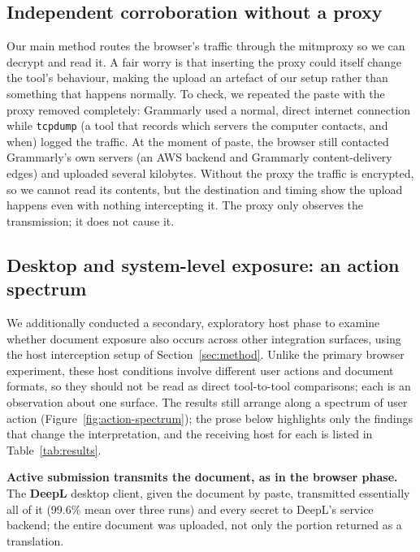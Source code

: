 \documentclass[10pt,conference,a4paper]{IEEEtran}
\begin{document}
\subsection{Independent corroboration without a proxy}

Our main method routes the browser's traffic through the mitmproxy so we can decrypt and
read it. A fair worry is that inserting the proxy could itself change the tool's behaviour,
making the upload an artefact of our setup rather than something that happens normally. To
check, we repeated the paste with the proxy removed completely: Grammarly used a normal,
direct internet connection while \texttt{tcpdump} (a tool that records which servers the
computer contacts, and when) logged the traffic. At the moment of paste, the browser still
contacted Grammarly's own servers (an AWS backend and Grammarly content-delivery edges) and
uploaded several kilobytes. Without the proxy the traffic is encrypted, so we cannot read
its contents, but the destination and timing show the upload happens even with nothing
intercepting it. The proxy only observes the transmission; it does not cause it.

\subsection{Desktop and system-level exposure: an action spectrum}
\label{sec:action-spectrum}

We additionally conducted a secondary, exploratory host phase to examine whether document
exposure also occurs across other integration surfaces, using the host interception setup
of Section~\ref{sec:method}. Unlike the primary browser experiment, these host conditions
involve different user actions and document formats, so they should not be read as direct
tool-to-tool comparisons; each is an observation about one surface. The results still
arrange along a spectrum of user action (Figure~\ref{fig:action-spectrum}); the prose below
highlights only the findings that change the interpretation, and the receiving host for
each is listed in Table~\ref{tab:results}.

\textbf{Active submission transmits the document, as in the browser phase.} The \textbf{DeepL} desktop
client, given the document by paste, transmitted essentially all of it (99.6\% mean over
three runs) and every secret to DeepL's service backend; the entire document was uploaded,
not only the portion returned as a translation.
\end{document}
